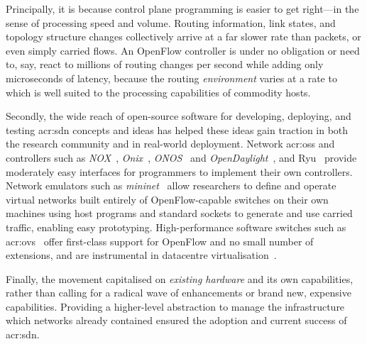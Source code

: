 Principally, it is because control plane programming is easier to get right---in the sense of processing speed and volume.
Routing information, link states, and topology structure changes collectively arrive at a far slower rate than packets, or even simply carried flows.
An OpenFlow controller is under no obligation or need to, say, react to millions of routing changes per second while adding only microseconds of latency, because the routing \emph{environment} varies at a rate to which is well suited to the processing capabilities of commodity hosts.

Secondly, the wide reach of open-source software for developing, deploying, and testing \gls{acr:sdn} concepts and ideas has helped these ideas gain traction in both the research community and in real-world deployment.
Network \glspl{acr:os} and controllers such as  \emph{NOX}~\parencite{DBLP:journals/ccr/GudeKPPCMS08}, \emph{Onix}~\parencite{DBLP:conf/osdi/KoponenCGSPZRIIHS10}, \emph{ONOS}~\parencite{onos} and \emph{OpenDaylight}~\parencite{opendaylight}, and Ryu~\parencite{ryu} provide moderately easy interfaces for programmers to implement their own controllers.
Network emulators such as \emph{mininet}~\parencite{DBLP:conf/hotnets/LantzHM10} allow researchers to define and operate virtual networks built entirely of OpenFlow-capable switches on their own machines using host programs and standard sockets to generate and use carried traffic, enabling easy prototyping.
High-performance software switches such as \gls{acr:ovs}~\parencite{DBLP:conf/nsdi/PfaffPKJZRGWSSA15} offer first-class support for OpenFlow and no small number of extensions, and are instrumental in datacentre virtualisation~\parencite{DBLP:conf/sigcomm/TuWAP21}.

Finally, the movement capitalised on \emph{existing hardware} and its own capabilities, rather than calling for a radical wave of enhancements or brand new, expensive capabilities.
Providing a higher-level abstraction to manage the infrastructure which networks already contained ensured the adoption and current success of \gls{acr:sdn}.


